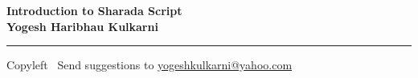 
\usepackage{polyglossia}
\setdefaultlanguage{sanskrit}

\usepackage{fontspec}
\setmainfont{Segoe UI}
\newfontfamily{}
\newfontfamily{}

\newfontfamily{}

\graphicspath{{images/}}



\footnotesize


\begin{center}
\Large{\textbf{Introduction to Sharada Script\\ Yogesh Haribhau Kulkarni}}  
\end{center}

\begin{multicols}{2}

\end{multicols}

\rule{\linewidth}{0.25pt}
\scriptsize
Copyleft \textcopyleft\  Send suggestions to 
\href{http://www.yogeshkulkarni.com}{yogeshkulkarni@yahoo.com}


